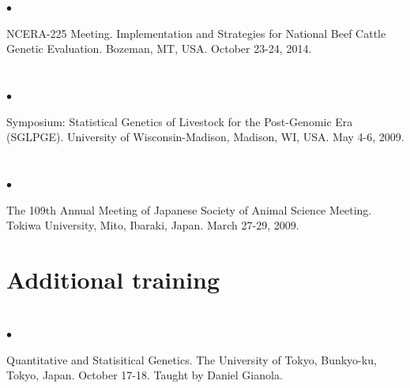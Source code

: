 \documentclass[margin,line,10pt]{res}
\newenvironment{list2}{
  \begin{list}{$\bullet$}{%
      \setlength{\itemsep}{0in}
      \setlength{\parsep}{0in} \setlength{\parskip}{0in}
      \setlength{\topsep}{0in} \setlength{\partopsep}{0in} 
      \setlength{\leftmargin}{0.2in}}}{\end{list}}
\begin{document}
\begin{resume}
\begin{list2}
\vspace{0.5cm}

\item NCERA-225 Meeting. Implementation and Strategies for National Beef Cattle Genetic Evaluation. Bozeman, MT, USA. October 23-24, 2014.  

\end{list2}  




\section{}
\begin{list2}
\item Symposium: Statistical Genetics of Livestock for the Post-Genomic Era (SGLPGE). University of Wisconsin-Madison, Madison, WI, USA. May 4-6, 2009.
\end{list2}  

\section{}
\begin{list2}
\item  The 109th Annual Meeting of Japanese Society of Animal Science Meeting. Tokiwa University, Mito, Ibaraki, Japan. March 27-29, 2009. 

\end{list2}













\vspace{0.5cm}
\section{ \sc Additional training}
\vspace{1cm}

\section{}
\begin{list2}

\item Quantitative and Statisitical Genetics. The University of Tokyo, Bunkyo-ku, Tokyo, Japan. October 17-18. Taught by Daniel Gianola.


\end{list2}
\end{resume}
\end{document}
